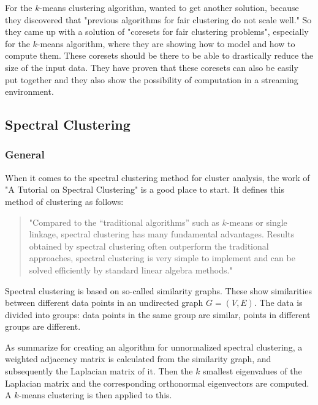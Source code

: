 For the $k$-means clustering algorithm, \textcite[]{Schmidt2018} wanted to get another solution, because they discovered that "previous algorithms for fair clustering do not scale well." So they came up with a solution of "coresets for fair clustering problems", especially for the $k$-means algorithm, where they are showing how to model and how to compute them. These coresets should be there to be able to drastically reduce the size of the input data. They have proven that these coresets can also be easily put together and they also show the possibility of computation in a streaming environment. \autocite[1]{Schmidt2018} 


\subsection{Spectral Clustering}
\label{spectral-clustering}

\subsubsection{General}

When it comes to the spectral clustering method for cluster analysis, the work of \textcite[]{VonLuxburg2007}  "A Tutorial on Spectral Clustering" is a good place to start. It defines this method of clustering as follows:

\begin{quote}
"Compared to the “traditional algorithms” such as $k$-means or single linkage, spectral clustering has many fundamental advantages. Results obtained by spectral clustering often outperform the traditional approaches, spectral clustering is very simple to implement and can be solved efficiently by standard linear algebra methods."

\autocite[1]{VonLuxburg2007}
\end{quote}

Spectral clustering is based on so-called similarity graphs. These show similarities between different data points in an undirected graph $G = (V,E)$. The data is divided into groups: data points in the same group are similar, points in different groups are different. \autocite[2]{VonLuxburg2007}

As \textcite[2]{Kleindessner2019} summarize for creating an algorithm for unnormalized spectral clustering, a weighted adjacency matrix is calculated from the similarity graph, and subsequently the Laplacian matrix of it. Then the $k$ smallest eigenvalues of the Laplacian matrix and the corresponding orthonormal eigenvectors are computed. A $k$-means clustering is then applied to this.

